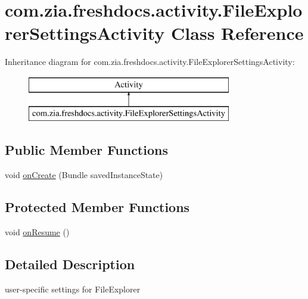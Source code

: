 \hypertarget{classcom_1_1zia_1_1freshdocs_1_1activity_1_1_file_explorer_settings_activity}{\section{com.\-zia.\-freshdocs.\-activity.\-File\-Explorer\-Settings\-Activity Class Reference}
\label{classcom_1_1zia_1_1freshdocs_1_1activity_1_1_file_explorer_settings_activity}
}
Inheritance diagram for com.\-zia.\-freshdocs.\-activity.\-File\-Explorer\-Settings\-Activity\-:\begin{figure}[H]
\begin{center}
\leavevmode
\includegraphics[height=2.000000cm]{classcom_1_1zia_1_1freshdocs_1_1activity_1_1_file_explorer_settings_activity}
\end{center}
\end{figure}
\subsection*{Public Member Functions}
\begin{DoxyCompactItemize}
\item 
void \hyperlink{classcom_1_1zia_1_1freshdocs_1_1activity_1_1_file_explorer_settings_activity_a02d7ab3a93b4cd38ed583822530a2a86}{on\-Create} (Bundle saved\-Instance\-State)
\end{DoxyCompactItemize}
\subsection*{Protected Member Functions}
\begin{DoxyCompactItemize}
\item 
void \hyperlink{classcom_1_1zia_1_1freshdocs_1_1activity_1_1_file_explorer_settings_activity_adf02613b17d9e236943a0bc5b6ba64d6}{on\-Resume} ()
\end{DoxyCompactItemize}


\subsection{Detailed Description}
user-\/specific settings for File\-Explorer 

